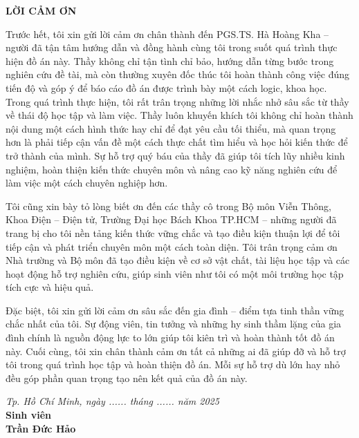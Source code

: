 \cleardoublepage
\thispagestyle{empty}
\begin{center}
    \vspace*{1.5cm}
    \textbf{\fontsize{16}{19}\selectfont LỜI CẢM ƠN}
    \vspace{0.8cm}
\end{center}

\noindent
\setlength{\parindent}{1.5cm}
\setlength{\parskip}{6pt}
\fontsize{12}{14}\selectfont  %

Trước hết, tôi xin gửi lời cảm ơn chân thành đến PGS.TS. Hà Hoàng Kha – người đã tận tâm hướng dẫn và đồng hành cùng tôi trong suốt quá trình thực hiện đồ án này. Thầy không chỉ tận tình chỉ bảo, hướng dẫn từng bước trong nghiên cứu đề tài, mà còn thường xuyên đốc thúc tôi hoàn thành công việc đúng tiến độ và góp ý để báo cáo đồ án được trình bày một cách logic, khoa học. Trong quá trình thực hiện, tôi rất trân trọng những lời nhắc nhở sâu sắc từ thầy về thái độ học tập và làm việc. Thầy luôn khuyến khích tôi không chỉ hoàn thành nội dung một cách hình thức hay chỉ để đạt yêu cầu tối thiểu, mà quan trọng hơn là phải tiếp cận vấn đề một cách thực chất tìm hiểu và học hỏi kiến thức để trở thành của mình. Sự hỗ trợ quý báu của thầy đã giúp tôi tích lũy nhiều kinh nghiệm, hoàn thiện kiến thức chuyên môn và nâng cao kỹ năng nghiên cứu để làm việc một cách chuyên nghiệp hơn.

Tôi cũng xin bày tỏ lòng biết ơn đến các thầy cô trong Bộ môn Viễn Thông, Khoa Điện – Điện tử, Trường Đại học Bách Khoa TP.HCM – những người đã trang bị cho tôi nền tảng kiến thức vững chắc và tạo điều kiện thuận lợi để tôi tiếp cận và phát triển chuyên môn một cách toàn diện. Tôi trân trọng cảm ơn Nhà trường và Bộ môn đã tạo điều kiện về cơ sở vật chất, tài liệu học tập và các hoạt động hỗ trợ nghiên cứu, giúp sinh viên như tôi có một môi trường học tập tích cực và hiệu quả.

Đặc biệt, tôi xin gửi lời cảm ơn sâu sắc đến gia đình – điểm tựa tinh thần vững chắc nhất của tôi. Sự động viên, tin tưởng và những hy sinh thầm lặng của gia đình chính là nguồn động lực to lớn giúp tôi kiên trì và hoàn thành tốt đồ án này. Cuối cùng, tôi xin chân thành cảm ơn tất cả những ai đã giúp đỡ và hỗ trợ tôi trong quá trình học tập và hoàn thiện đồ án. Mỗi sự hỗ trợ dù lớn hay nhỏ đều góp phần quan trọng tạo nên kết quả của đồ án này.

\vspace{0.8cm}
\begin{flushright}
    \begin{minipage}{0.5\textwidth}
        \centering
        \textit{Tp. Hồ Chí Minh, ngày ...... tháng ...... năm 2025} \\
        \vspace{0.8cm}
        \textbf{Sinh viên} \\
        \vspace{0.3cm}
        \textbf{Trần Đức Hảo}
    \end{minipage}
\end{flushright}

\vfill
\newpage
